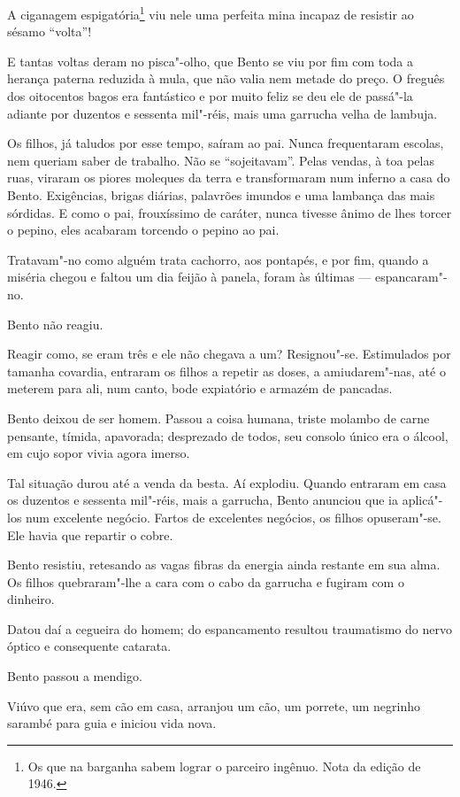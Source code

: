 A ciganagem espigatória\footnote{Os que na barganha sabem lograr o
  parceiro ingênuo. Nota da edição de 1946.} viu nele uma perfeita mina
incapaz de resistir ao sésamo ``volta''!

E tantas voltas deram no pisca"-olho, que Bento se viu por fim com toda a
herança paterna reduzida à mula, que não valia nem metade do preço. O
freguês dos oitocentos bagos era fantástico e por muito feliz se deu ele
de passá"-la adiante por duzentos e sessenta mil"-réis, mais uma garrucha
velha de lambuja.

Os filhos, já taludos por esse tempo, saíram ao pai. Nunca frequentaram
escolas, nem queriam saber de trabalho. Não se ``sojeitavam''. Pelas
vendas, à toa pelas ruas, viraram os piores moleques da terra e
transformaram num inferno a casa do Bento. Exigências, brigas diárias,
palavrões imundos e uma lambança das mais sórdidas. E como o pai,
frouxíssimo de caráter, nunca tivesse ânimo de lhes torcer o pepino,
eles acabaram torcendo o pepino ao pai.

Tratavam"-no como alguém trata cachorro, aos pontapés, e por fim, quando
a miséria chegou e faltou um dia feijão à panela, foram às últimas ---
espancaram"-no.

Bento não reagiu.

Reagir como, se eram três e ele não chegava a um? Resignou"-se.
Estimulados por tamanha covardia, entraram os filhos a repetir as doses,
a amiudarem"-nas, até o meterem para ali, num canto, bode expiatório e
armazém de pancadas.

Bento deixou de ser homem. Passou a coisa humana, triste molambo de
carne pensante, tímida, apavorada; desprezado de todos, seu consolo
único era o álcool, em cujo sopor vivia agora imerso.

Tal situação durou até a venda da besta. Aí explodiu. Quando entraram em
casa os duzentos e sessenta mil"-réis, mais a garrucha, Bento anunciou
que ia aplicá"-los num excelente negócio. Fartos de excelentes negócios,
os filhos opuseram"-se. Ele havia que repartir o cobre.

Bento resistiu, retesando as vagas fibras da energia ainda restante em
sua alma. Os filhos quebraram"-lhe a cara com o cabo da garrucha e
fugiram com o dinheiro.

Datou daí a cegueira do homem; do espancamento resultou traumatismo do
nervo óptico e consequente catarata.

Bento passou a mendigo.

Viúvo que era, sem cão em casa, arranjou um cão, um porrete, um negrinho
sarambé para guia e iniciou vida nova.

